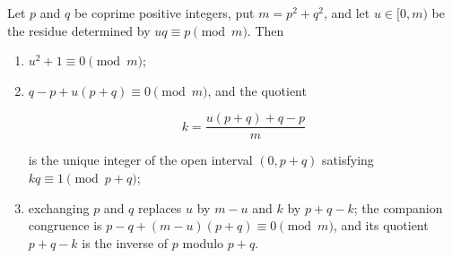 \begin{proposition}
\label{prop:gauss-congruence}
Let $p$ and $q$ be coprime positive integers, put $m=p^2+q^2$, and let
$u\in[0,m)$ be the residue determined by $uq\equiv p\pmod m$. Then

\begin{enumerate}[label=\textup{(\roman*)}]
 \item $u^2+1\equiv0\pmod m$;
 \item $q-p+u(p+q)\equiv0\pmod m$, and the quotient

 \begin{equation}
  k=\frac{u(p+q)+q-p}{m}
  \label{eq:gauss-quotient}
 \end{equation}

 is the unique integer of the open interval $(0,p+q)$ satisfying
 $kq\equiv1\pmod{p+q}$;
 \item exchanging $p$ and $q$ replaces $u$ by $m-u$ and $k$ by $p+q-k$; the
 companion congruence is $p-q+(m-u)(p+q)\equiv0\pmod m$, and its quotient
 $p+q-k$ is the inverse of $p$ modulo $p+q$.
\end{enumerate}
\end{proposition}

